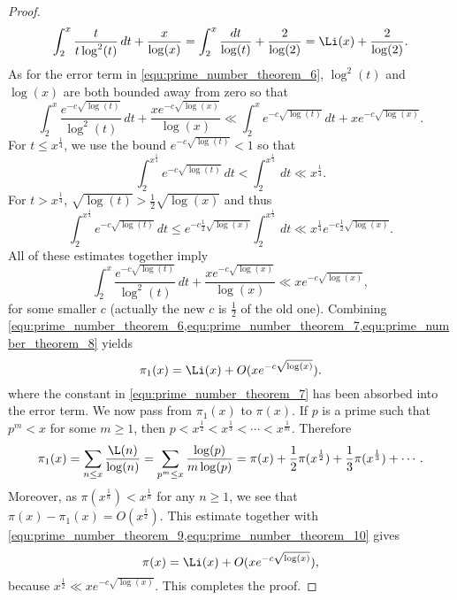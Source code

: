\begin{proof}
        \begin{equation}\label{equ:prime_number_theorem_7}
          \int_{2}^{x}\frac{t}{t\log^{2}(t)}\,dt+\frac{x}{\log(x)} = \int_{2}^{x}\frac{dt}{\log(t)}+\frac{2}{\log(2)} = \Li(x)+\frac{2}{\log(2)}.
        \end{equation}
        As for the error term in \cref{equ:prime_number_theorem_6}, $\log^{2}(t)$ and $\log(x)$ are both bounded away from zero so that
        \[
          \int_{2}^{x}\frac{e^{-c\sqrt{\log(t)}}}{\log^{2}(t)}\,dt+\frac{xe^{-c\sqrt{\log(x)}}}{\log(x)} \ll \int_{2}^{x}e^{-c\sqrt{\log(t)}}\,dt+xe^{-c\sqrt{\log(x)}}.
        \]
        For $t \le x^{\frac{1}{4}}$, we use the bound $e^{-c\sqrt{\log(t)}} < 1$ so that
        \[
          \int_{2}^{x^{\frac{1}{4}}}e^{-c\sqrt{\log(t)}}\,dt < \int_{2}^{x^{\frac{1}{4}}}\,dt \ll x^{\frac{1}{4}}.
        \]
        For $t > x^{\frac{1}{4}}$, $\sqrt{\log(t)} > \frac{1}{2}\sqrt{\log(x)}$ and thus
        \[
          \int_{2}^{x^{\frac{1}{4}}}e^{-c\sqrt{\log(t)}}\,dt \le e^{-c\frac{1}{2}\sqrt{\log(x)}}\int_{2}^{x^{\frac{1}{4}}}\,dt \ll x^{\frac{1}{4}}e^{-c\frac{1}{2}\sqrt{\log(x)}}. 
        \]
        All of these estimates together imply
        \begin{equation}\label{equ:prime_number_theorem_8}
          \int_{2}^{x}\frac{e^{-c\sqrt{\log(t)}}}{\log^{2}(t)}\,dt+\frac{xe^{-c\sqrt{\log(x)}}}{\log(x)} \ll xe^{-c\sqrt{\log(x)}},
        \end{equation}
        for some smaller $c$ (actually the new $c$ is $\frac{1}{2}$ of the old one). Combining \cref{equ:prime_number_theorem_6,equ:prime_number_theorem_7,equ:prime_number_theorem_8} yields
        \begin{equation}\label{equ:prime_number_theorem_9}
          \pi_{1}(x) = \Li(x)+O(xe^{-c\sqrt{\log(x)}}).
        \end{equation}
        where the constant in \cref{equ:prime_number_theorem_7} has been absorbed into the error term. We now pass from $\pi_{1}(x)$ to $\pi(x)$. If $p$ is a prime such that $p^{m} < x$ for some $m \ge 1$, then $p < x^{\frac{1}{2}} < x^{\frac{1}{3}} < \cdots < x^{\frac{1}{m}}$. Therefore
        \begin{equation}\label{equ:prime_number_theorem_10}
          \pi_{1}(x) = \sum_{n \le x}\frac{\L(n)}{\log(n)} = \sum_{p^{m} \le x}\frac{\log(p)}{m\log(p)} = \pi(x)+\frac{1}{2}\pi(x^{\frac{1}{2}})+\frac{1}{3}\pi(x^{\frac{1}{3}})+\cdots.
        \end{equation}
        Moreover, as $\pi(x^{\frac{1}{n}}) < x^{\frac{1}{n}}$ for any $n \ge 1$, we see that $\pi(x)-\pi_{1}(x) = O(x^{\frac{1}{2}})$. This estimate together with \cref{equ:prime_number_theorem_9,equ:prime_number_theorem_10} gives
        \[
          \pi(x) = \Li(x)+O(xe^{-c\sqrt{\log(x)}}),
        \]
        because $x^{\frac{1}{2}} \ll xe^{-c\sqrt{\log(x)}}$. This completes the proof.
      \end{proof}

